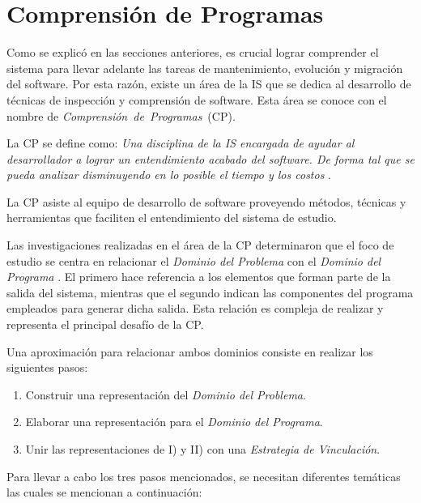 \section{Comprensión de Programas}

Como se explicó en las secciones anteriores, es crucial lograr comprender el sistema para llevar adelante las tareas de mantenimiento, evolución y migración del software.	
Por esta razón, existe un área de la IS que se dedica al desarrollo de técnicas de inspección y comprensión de software. Esta área se conoce con el nombre de \mbox{\textit{Comprensión de Programas} (CP).}

La CP se define como: \textit{Una disciplina de la IS encargada de ayudar al desarrollador a lograr un entendimiento acabado del software. De forma tal que se pueda analizar disminuyendo en lo posible el tiempo y los costos} \cite{MPMR07}.  

La CP asiste al equipo de desarrollo de software proveyendo métodos, técnicas y herramientas que faciliten el entendimiento del sistema de estudio.

Las investigaciones realizadas en el área de la CP determinaron que el foco de estudio se centra en relacionar el \textit{Dominio del Problema} con el \textit{Dominio del Programa} \cite{BRM10,MPMR07,AMPM11,DWE04}. El primero hace referencia a los elementos que forman parte de la salida del sistema, mientras que el segundo indican las componentes del programa empleados para generar dicha salida.
Esta relación es compleja de realizar y representa el principal desafío de la CP. 

Una aproximación para relacionar ambos dominios consiste en realizar los siguientes pasos:

\begin{enumerate}[label=\Roman*)]
\item Construir una representación del \textit{Dominio del Problema}.
\item Elaborar una representación para el \textit{Dominio del Programa}.
\item Unir las representaciones de I) y II) con una \textit{Estrategia de Vinculación}.
\end{enumerate}


Para llevar a cabo los tres pasos mencionados, se necesitan diferentes temáticas las cuales se mencionan a continuación:



